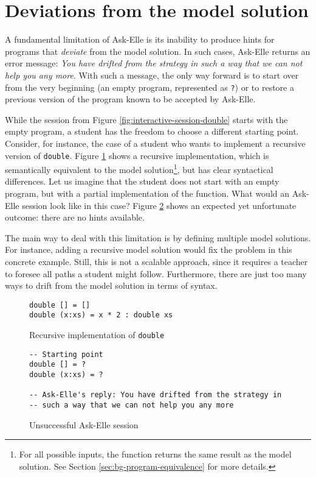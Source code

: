 \section{Deviations from the model solution}
\label{sec:intro-fundamental-limitation}

A fundamental limitation of Ask-Elle is its inability to produce hints for programs that \emph{deviate} from the model solution. In such cases, Ask-Elle returns an error message: \emph{You have drifted from the strategy in such a way that we can not help you any more}. With such a message, the only way forward is to start over from the very beginning (an empty program, represented as \texttt{?}) or to restore a previous version of the program known to be accepted by Ask-Elle.

While the session from Figure \ref{fig:interactive-session-double} starts with the empty program, a student has the freedom to choose a different starting point. Consider, for instance, the case of a student who wants to implement a recursive version of \texttt{double}. Figure \ref{fig:limitations-recursive-double} shows a recursive implementation, which is semantically equivalent to the model solution\footnote{For all possible inputs, the function returns the same result as the model solution. See Section \ref{sec:bg-program-equivalence} for more details.}, but has clear syntactical differences. Let us imagine that the student does not start with an empty program, but with a partial implementation of the function. What would an Ask-Elle session look like in this case? Figure \ref{fig:limitations-askelle-example-session} shows an expected yet unfortunate outcome: there are no hints available.

The main way to deal with this limitation is by defining multiple model solutions. For instance, adding a recursive model solution would fix the problem in this concrete example. Still, this is not a scalable approach, since it requires a teacher to foresee all paths a student might follow. Furthermore, there are just too many ways to drift from the model solution in terms of syntax.

\begin{figure}
\begin{verbatim}
double [] = []
double (x:xs) = x * 2 : double xs
\end{verbatim}
\caption{Recursive implementation of \texttt{double}}
\label{fig:limitations-recursive-double}
\end{figure}

\begin{figure}
\begin{verbatim}
-- Starting point
double [] = ?
double (x:xs) = ?

-- Ask-Elle's reply: You have drifted from the strategy in
-- such a way that we can not help you any more
\end{verbatim}
\caption{Unsuccessful Ask-Elle session}
\label{fig:limitations-askelle-example-session}
\end{figure}

